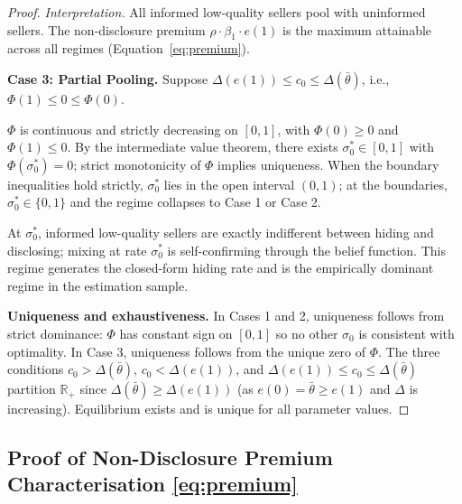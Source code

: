 \documentclass[10pt,letterpaper]{bp-template-concise}
\begin{document}
\begin{proof}
\textit{Interpretation.} All informed low-quality sellers pool with uninformed sellers. The non-disclosure premium $\rho\cdot\beta_1\cdot e(1)$ is the maximum attainable across all regimes (Equation~\eqref{eq:premium}).

\medskip
\textbf{Case 3: Partial Pooling.} Suppose $\Delta(e(1)) \leq c_0 \leq \Delta(\bar{\theta})$, i.e., $\Phi(1) \leq 0 \leq \Phi(0)$.

$\Phi$ is continuous and strictly decreasing on $[0,1]$, with $\Phi(0) \geq 0$ and $\Phi(1) \leq 0$. By the intermediate value theorem, there exists $\sigma_0^* \in [0,1]$ with $\Phi(\sigma_0^*) = 0$; strict monotonicity of $\Phi$ implies uniqueness. When the boundary inequalities hold strictly, $\sigma_0^*$ lies in the open interval $(0,1)$; at the boundaries, $\sigma_0^* \in \{0,1\}$ and the regime collapses to Case 1 or Case 2.

At $\sigma_0^*$, informed low-quality sellers are exactly indifferent between hiding and disclosing; mixing at rate $\sigma_0^*$ is self-confirming through the belief function. This regime generates the closed-form hiding rate and is the empirically dominant regime in the estimation sample.

\medskip
\textbf{Uniqueness and exhaustiveness.} In Cases 1 and 2, uniqueness follows from strict dominance: $\Phi$ has constant sign on $[0,1]$ so no other $\sigma_0$ is consistent with optimality. In Case 3, uniqueness follows from the unique zero of $\Phi$. The three conditions $c_0 > \Delta(\bar{\theta})$, $c_0 < \Delta(e(1))$, and $\Delta(e(1)) \leq c_0 \leq \Delta(\bar{\theta})$ partition $\mathbb{R}_{+}$ since $\Delta(\bar{\theta}) \geq \Delta(e(1))$ (as $e(0) = \bar{\theta} \geq e(1)$ and $\Delta$ is increasing). Equilibrium exists and is unique for all parameter values.
\end{proof}

\subsection*{Proof of Non-Disclosure Premium Characterisation \eqref{eq:premium}}
\end{document}
